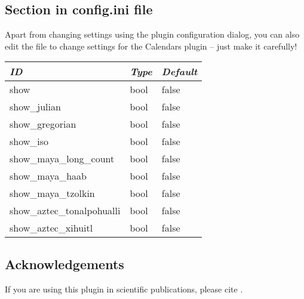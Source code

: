 \subsection*{Section  in config.ini file}

Apart from changing settings using the plugin configuration dialog,
you can also edit the  file to change
settings for the Calendars plugin -- just make it carefully!

\begin{longtable}{l|l|l}\toprule
\emph{ID}                      &\emph{Type} & \emph{Default}  \\\midrule
show                         &bool & false\\\midrule
show\_julian                 &bool & false\\
show\_gregorian              &bool & false\\
show\_iso                    &bool & false\\\midrule
show\_maya\_long\_count      &bool & false\\
show\_maya\_haab             &bool & false\\
show\_maya\_tzolkin          &bool & false\\
show\_aztec\_tonalpohualli   &bool & false\\
show\_aztec\_xihuitl         &bool & false\\\bottomrule
\end{longtable}

\subsection{Acknowledgements}

If you are using this plugin in scientific publications, please cite \citet{Zotti-etal:JSA2020.6.2}.



